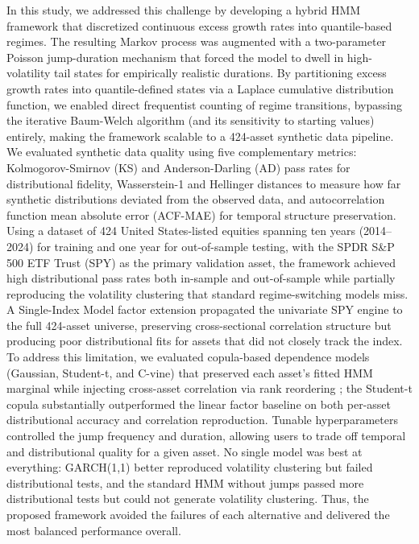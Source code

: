 In this study, we addressed this challenge by developing a hybrid HMM framework that discretized continuous excess growth rates into quantile-based regimes. The resulting Markov process was augmented with a two-parameter Poisson jump-duration mechanism that forced the model to dwell in high-volatility tail states for empirically realistic durations. By partitioning excess growth rates into quantile-defined states via a Laplace cumulative distribution function, we enabled direct frequentist counting of regime transitions, bypassing the iterative Baum-Welch algorithm (and its sensitivity to starting values) entirely, making the framework scalable to a 424-asset synthetic data pipeline. We evaluated synthetic data quality using five complementary metrics: Kolmogorov-Smirnov (KS) and Anderson-Darling (AD) pass rates for distributional fidelity, Wasserstein-1 and Hellinger distances to measure how far synthetic distributions deviated from the observed data, and autocorrelation function mean absolute error (ACF-MAE) for temporal structure preservation. Using a dataset of 424 United States-listed equities spanning ten years (2014--2024) for training and one year for out-of-sample testing, with the SPDR S\&P 500 ETF Trust (SPY) as the primary validation asset, the framework achieved high distributional pass rates both in-sample and out-of-sample while partially reproducing the volatility clustering that standard regime-switching models miss. A Single-Index Model factor extension \cite{sharpe_simplified_1963} propagated the univariate SPY engine to the full 424-asset universe, preserving cross-sectional correlation structure but producing poor distributional fits for assets that did not closely track the index. To address this limitation, we evaluated copula-based dependence models (Gaussian, Student-t, and C-vine) that preserved each asset's fitted HMM marginal while injecting cross-asset correlation via rank reordering \cite{embrechts_copulas_2002, aas_pair_2009}; the Student-t copula substantially outperformed the linear factor baseline on both per-asset distributional accuracy and correlation reproduction. Tunable hyperparameters controlled the jump frequency and duration, allowing users to trade off temporal and distributional quality for a given asset. No single model was best at everything: GARCH(1,1) better reproduced volatility clustering but failed distributional tests, and the standard HMM without jumps passed more distributional tests but could not generate volatility clustering. Thus, the proposed framework avoided the failures of each alternative and delivered the most balanced performance overall.

